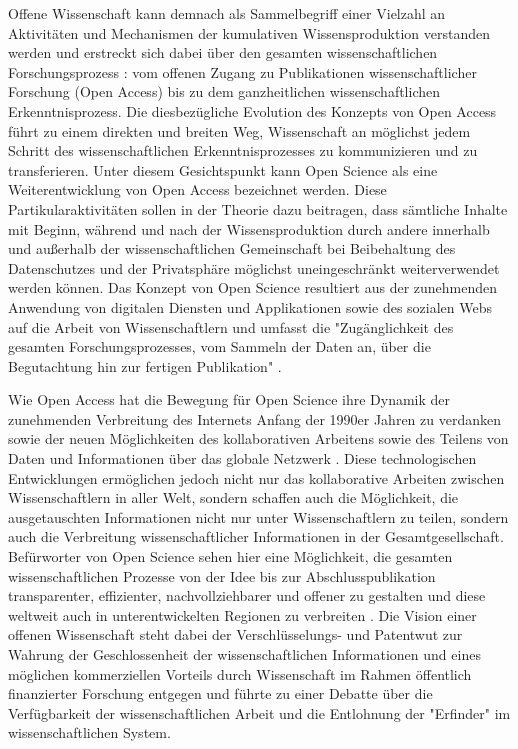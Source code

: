 Offene Wissenschaft kann demnach als Sammelbegriff einer Vielzahl an Aktivitäten und Mechanismen der kumulativen Wissensproduktion verstanden werden \cite{Mukherjee_2009} und erstreckt sich dabei über den gesamten wissenschaftlichen Forschungsprozess \cite{Scheliga_2014}: vom offenen Zugang zu Publikationen wissenschaftlicher Forschung (Open Access) bis zu dem ganzheitlichen wissenschaftlichen Erkenntnisprozess. Die diesbezügliche Evolution des Konzepts von Open Access führt zu einem direkten und breiten Weg, Wissenschaft an möglichst jedem Schritt des wissenschaftlichen Erkenntnisprozesses zu kommunizieren und zu transferieren. Unter diesem Gesichtspunkt kann Open Science als eine Weiterentwicklung von Open Access bezeichnet werden. Diese Partikularaktivitäten sollen in der Theorie dazu beitragen, dass sämtliche Inhalte mit Beginn, während und nach der Wissensproduktion durch andere innerhalb und außerhalb der wissenschaftlichen Gemeinschaft bei Beibehaltung des Datenschutzes und der Privatsphäre möglichst uneingeschränkt weiterverwendet werden können. Das Konzept von Open Science resultiert aus der zunehmenden Anwendung von digitalen Diensten und Applikationen sowie des sozialen Webs auf die Arbeit von Wissenschaftlern und umfasst die "Zugänglichkeit des gesamten Forschungsprozesses, vom Sammeln der Daten an, über die Begutachtung hin zur fertigen Publikation" \cite{Brembs_2015}.

Wie Open Access hat die Bewegung für Open Science ihre Dynamik der zunehmenden Verbreitung des Internets Anfang der 1990er Jahren zu verdanken \cite{Lievrouw_2010} sowie der neuen Möglichkeiten des kollaborativen Arbeitens sowie des Teilens von Daten und Informationen über das globale Netzwerk \cite{Meyer_2013}. Diese technologischen Entwicklungen ermöglichen jedoch nicht nur das kollaborative Arbeiten zwischen Wissenschaftlern in aller Welt, sondern schaffen auch die Möglichkeit, die ausgetauschten Informationen nicht nur unter Wissenschaftlern zu teilen, sondern auch die Verbreitung wissenschaftlicher Informationen in der Gesamtgesellschaft. Befürworter von Open Science sehen hier eine Möglichkeit, die gesamten wissenschaftlichen Prozesse von der Idee bis zur Abschlusspublikation transparenter, effizienter, nachvollziehbarer und offener zu gestalten \cite{Woelfle_2011} und diese weltweit auch in unterentwickelten Regionen zu verbreiten \cite{Yiotis_2013}. Die Vision einer offenen Wissenschaft steht dabei der Verschlüsselungs- und Patentwut zur Wahrung der Geschlossenheit der wissenschaftlichen Informationen und eines möglichen kommerziellen Vorteils durch Wissenschaft im Rahmen öffentlich finanzierter Forschung entgegen und führte zu einer Debatte über die Verfügbarkeit der wissenschaftlichen Arbeit und die Entlohnung der "Erfinder" im wissenschaftlichen System.


